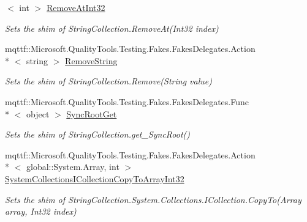 \begin{DoxyCompactItemize}
$<$ int $>$ \hyperlink{class_system_1_1_collections_1_1_specialized_1_1_fakes_1_1_shim_string_collection_a3657c38eec1068ad4436f8536933fd09}{Remove\-At\-Int32}
\begin{DoxyCompactList}\small\item\em Sets the shim of String\-Collection.\-Remove\-At(\-Int32 index)\end{DoxyCompactList}\item 
mqttf\-::\-Microsoft.\-Quality\-Tools.\-Testing.\-Fakes.\-Fakes\-Delegates.\-Action\\*
$<$ string $>$ \hyperlink{class_system_1_1_collections_1_1_specialized_1_1_fakes_1_1_shim_string_collection_af56cfae1b3e03074de7eb04ed5ee4acb}{Remove\-String}
\begin{DoxyCompactList}\small\item\em Sets the shim of String\-Collection.\-Remove(\-String value)\end{DoxyCompactList}\item 
mqttf\-::\-Microsoft.\-Quality\-Tools.\-Testing.\-Fakes.\-Fakes\-Delegates.\-Func\\*
$<$ object $>$ \hyperlink{class_system_1_1_collections_1_1_specialized_1_1_fakes_1_1_shim_string_collection_a52b11a85bda01a8ce563fd062a83cd18}{Sync\-Root\-Get}
\begin{DoxyCompactList}\small\item\em Sets the shim of String\-Collection.\-get\-\_\-\-Sync\-Root()\end{DoxyCompactList}\item 
mqttf\-::\-Microsoft.\-Quality\-Tools.\-Testing.\-Fakes.\-Fakes\-Delegates.\-Action\\*
$<$ global\-::\-System.\-Array, int $>$ \hyperlink{class_system_1_1_collections_1_1_specialized_1_1_fakes_1_1_shim_string_collection_af782a8f5d26ea886266a42fa7a74cfab}{System\-Collections\-I\-Collection\-Copy\-To\-Array\-Int32}
\begin{DoxyCompactList}\small\item\em Sets the shim of String\-Collection.\-System.\-Collections.\-I\-Collection.\-Copy\-To(\-Array array, Int32 index)\end{DoxyCompactList}\item 

\end{DoxyCompactItemize}
